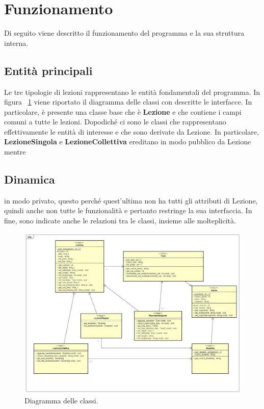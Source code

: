 \section{Funzionamento}
Di seguito viene descritto il funzionamento del programma e la sua struttura interna.
\subsection{Entità principali}
Le tre tipologie di lezioni rappresentano le entità fondamentali del programma. In figura \Fig~\ref{fig:ClassDiagram} viene riportato il diagramma delle classi con descritte le interfacce. In particolare, è presente una classe base che è \textbf{Lezione} e che contiene i campi comuni a tutte le lezioni. Dopodiché ci sono le classi che rappresentano effettivamente le entità di interesse e che sono derivate da Lezione. In particolare, \textbf{LezioneSingola} e \textbf{LezioneCollettiva} ereditano in modo pubblico da Lezione mentre \subsection{Dinamica} in modo privato, questo perché quest'ultima non ha tutti gli attributi di Lezione, quindi anche non tutte le funzionalità e pertanto restringe la sua interfaccia. In fine, sono indicate anche le relazioni tra le classi, insieme alle molteplicità.
\begin{figure}[ht]
	\centering
	\includegraphics[width=0.8\linewidth]{ImageFiles/c++/ClassDiagram}
	\caption{Diagramma delle classi.}
	\label{fig:ClassDiagram}
\end{figure}

